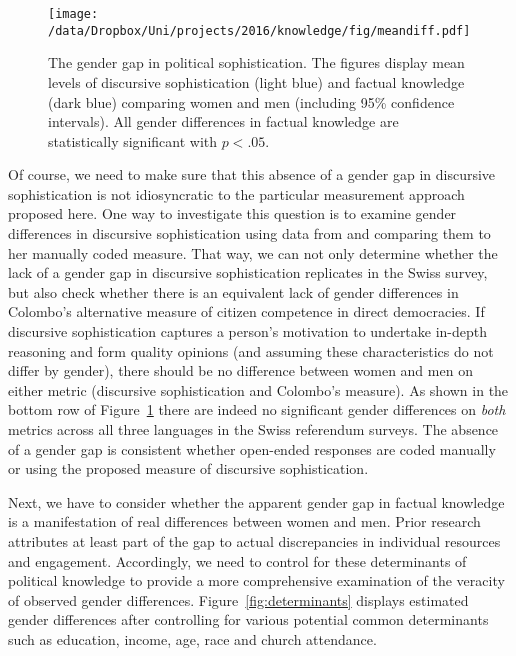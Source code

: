 \begin{figure}[ht]\centering
	\texttt{[image: /data/Dropbox/Uni/projects/2016/knowledge/fig/meandiff.pdf]}
	\caption[The gender gap in political sophistication]{The gender gap in political sophistication. The figures display mean levels of discursive sophistication (light blue) and factual knowledge (dark blue) comparing women and men (including 95\% confidence intervals). All gender differences in factual knowledge are statistically significant with $p<.05$.}\label{fig:meandiff}
\end{figure}


Of course, we need to make sure that this absence of a gender gap in discursive sophistication is not idiosyncratic to the particular measurement approach proposed here. One way to investigate this question is to examine gender differences in discursive sophistication using data from \citet{colombo2016justifications} and comparing them to her manually coded measure. That way, we can not only determine whether the lack of a gender gap in discursive sophistication replicates in the Swiss survey, but also check whether there is an equivalent lack of gender differences in Colombo's alternative measure of citizen competence in direct democracies. If discursive sophistication captures a person's motivation to undertake in-depth reasoning and form quality opinions (and assuming these characteristics do not differ by gender), there should be no difference between women and men on either metric (discursive sophistication and Colombo's measure). As shown in the bottom row of Figure~\ref{fig:meandiff} there are indeed no significant gender differences on \textit{both} metrics across all three languages in the Swiss referendum surveys. The absence of a gender gap is consistent whether open-ended responses are coded manually or using the proposed measure of discursive sophistication.

Next, we have to consider whether the apparent gender gap in factual knowledge is a manifestation of real differences between women and men. Prior research attributes at least part of the gap to actual discrepancies in individual resources and engagement. Accordingly, we need to control for these determinants of political knowledge to provide a more comprehensive examination of the veracity of observed gender differences. Figure~\ref{fig:determinants} displays estimated gender differences after controlling for various potential common determinants such as education, income, age, race and church attendance.


